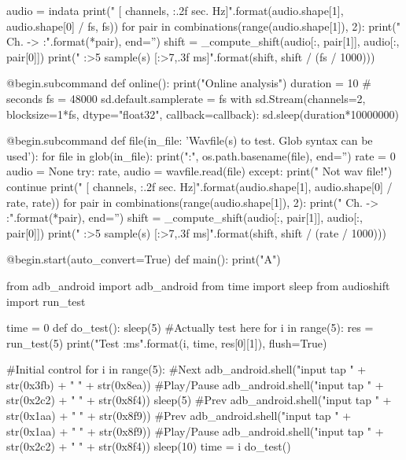 \begin{mdframed}
\begin{python}
    audio = indata
    print("  [{} channels, {:.2f} sec. {} Hz]".format(audio.shape[1], audio.shape[0] / fs, fs))
    for pair in combinations(range(audio.shape[1]), 2):
        print("  Ch. {} -> {}:".format(*pair), end='')
        shift = _compute_shift(audio[:, pair[1]], audio[:, pair[0]])
        print(" {:>5} sample(s) [{:>7,.3f} ms]".format(shift, shift / (fs / 1000)))

@begin.subcommand
def online():
    print("Online analysis")
    duration = 10 # seconds
    fs = 48000
    sd.default.samplerate = fs
    with sd.Stream(channels=2, blocksize=1*fs, dtype="float32", callback=callback):
        sd.sleep(duration*10000000)

@begin.subcommand
def file(in_file: 'Wavfile(s) to test. Glob syntax can be used'):
    for file in glob(in_file):
        print("\nFile:", os.path.basename(file), end='')
        rate = 0
        audio = None
        try:
            rate, audio = wavfile.read(file)
        except:
            print("  Not wav file!")
            continue
        print("  [{} channels, {:.2f} sec. {} Hz]".format(audio.shape[1], audio.shape[0] / rate, rate))
        for pair in combinations(range(audio.shape[1]), 2):
            print("  Ch. {} -> {}:".format(*pair), end='')
            shift = _compute_shift(audio[:, pair[1]], audio[:, pair[0]])
            print(" {:>5} sample(s) [{:>7,.3f} ms]".format(shift, shift / (rate / 1000)))

@begin.start(auto_convert=True)
def main():
    print("A")
    \end{python}
\end{mdframed}
\clearpage

\begin{mdframed}
    \begin{python}
from adb_android import adb_android
from time import sleep
from audioshift import run_test

time = 0
def do_test():
    sleep(5)
    #Actually test here
    for i in range(5):
        res = run_test(5)
        print("Test {} {}:{}ms".format(i, time, res[0][1]), flush=True)

#Initial control
for i in range(5):
    #Next
    adb_android.shell("input tap " + str(0x3fb) + " " + str(0x8ea))
    #Play/Pause
    adb_android.shell("input tap " + str(0x2c2) + " " + str(0x8f4))
    sleep(5)
    #Prev
    adb_android.shell("input tap " + str(0x1aa) + " " + str(0x8f9))
    #Prev
    adb_android.shell("input tap " + str(0x1aa) + " " + str(0x8f9))
    #Play/Pause
    adb_android.shell("input tap " + str(0x2c2) + " " + str(0x8f4))
    sleep(10)
    time = i
    do_test()
    \end{python}
\end{mdframed}
\clearpage

